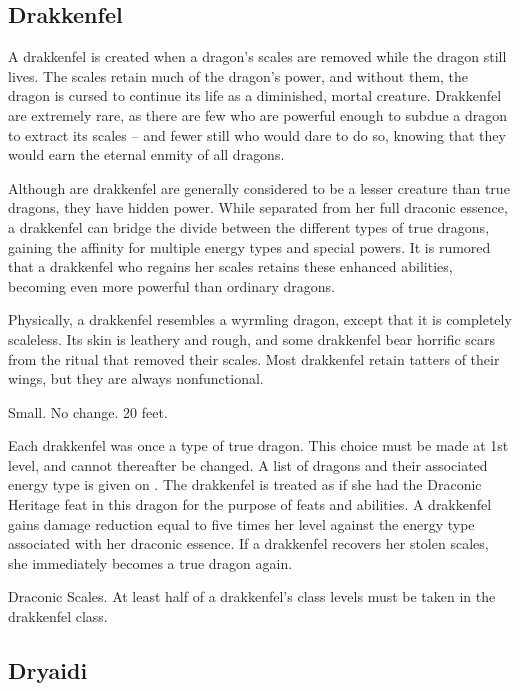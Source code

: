\subsection{Drakkenfel}

A drakkenfel is created when a dragon's scales are removed while the dragon still lives. The scales retain much of the dragon's power, and without them, the dragon is cursed to continue its life as a diminished, mortal creature. Drakkenfel are extremely rare, as there are few who are powerful enough to subdue a dragon to extract its scales -- and fewer still who would dare to do so, knowing that they would earn the eternal enmity of all dragons.

Although are drakkenfel are generally considered to be a lesser creature than true dragons, they have hidden power. While separated from her full draconic essence, a drakkenfel can bridge the divide between the different types of true dragons, gaining the affinity for multiple energy types and special powers. It is rumored that a drakkenfel who regains her scales retains these enhanced abilities, becoming even more powerful than ordinary dragons.

Physically, a drakkenfel resembles a wyrmling dragon, except that it is completely scaleless. Its skin is leathery and rough, and some drakkenfel bear horrific scars from the ritual that removed their scales. Most drakkenfel retain tatters of their wings, but they are always nonfunctional.

 Small.
 No change.
 20 feet.
\begin{itemize}
     Each drakkenfel was once a type of true dragon. This choice must be made at 1st level, and cannot thereafter be changed. A list of dragons and their associated energy type is given on . The drakkenfel is treated as if she had the Draconic Heritage feat in this dragon for the purpose of feats and abilities.
     A drakkenfel gains damage reduction equal to five times her level against the energy type associated with her draconic essence.
     If a drakkenfel recovers her stolen scales, she immediately becomes a true dragon again.
\end{itemize}
 Draconic Scales.
 At least half of a drakkenfel's class levels must be taken in the drakkenfel class.

\subsection{Dryaidi}

